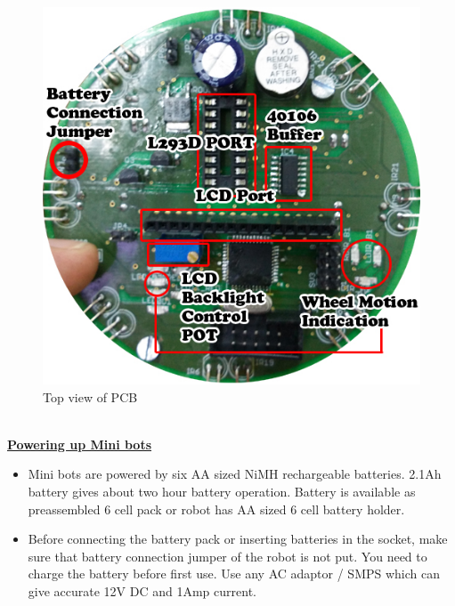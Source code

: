 \documentclass[a4paper,12pt,oneside]{book}
\begin{document}
	\begin{figure}[h!]
		\caption{Top view of PCB}
		\includegraphics[width=\textwidth]{./HardwareManual/Front.jpg}
	\end{figure}
	\hfill\\
	
	\underline{\textbf{\Large{Powering up Mini bots}}}
	\begin{itemize}
		\item{Mini bots are powered by six AA sized NiMH rechargeable batteries. 2.1Ah battery gives about
			two hour battery operation. Battery is available as preassembled 6 cell pack or robot has AA
			sized 6 cell battery holder.}
		\item{Before connecting the battery pack or inserting batteries in the socket, make sure that 	battery connection jumper of the robot is not put. You need to charge the battery before first use. Use any AC adaptor / SMPS	which can give accurate 12V DC and 1Amp current.}
	\end{itemize}
\end{document}
